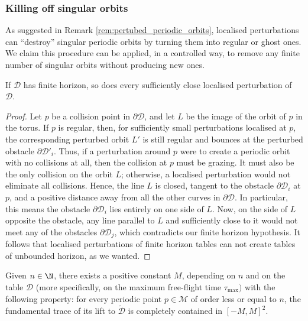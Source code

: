 \documentclass[reqno,11pt]{amsart}
\begin{document}
\subsubsection{Killing off singular orbits} As suggested in Remark \ref{rem:pertubed_periodic_orbits}, localised perturbations can ``destroy'' singular periodic orbits by turning them into regular or ghost ones.
We claim this procedure can be applied, in a controlled way, to remove any finite number of singular orbits without producing new ones.
\begin{lemma}\label{lem:fin_hor_persists}
    If \( \mathcal{D} \) has finite horizon, so does every sufficiently close localised perturbation of \( \mathcal{D}. \)   
\end{lemma}
\begin{proof}
    Let \( p \) be a collision point in \( \partial\mathcal{D} \), and let \( L \) be the image of the orbit of \( p \) in the torus.
    If \( p \) is regular, then, for sufficiently small perturbations localised at \( p \), the corresponding perturbed orbit \( L' \) is still regular and bounces at the perturbed obstacle \( \partial\mathcal{D}'_i \).
    Thus, if a perturbation around \( p \) were to create a periodic orbit with no collisions at all, then the collision at \( p \) must be grazing.
    It must also be the only collision on the orbit \( L \); otherwise, a localised perturbation would not eliminate all collisions.
    Hence, the line \( L \) is closed, tangent to the obstacle \( \partial\mathcal{D}_i \) at \( p \), and a positive distance away from all the other curves in \( \partial\mathcal{D} \).
    In particular, this means the obstacle \( \partial\mathcal{D}_i \) lies entirely on one side of \( L \).
    Now, on the side of \( L \) opposite the obstacle, any line parallel to \( L \) and sufficiently close to it would not meet any of the obstacles \( \partial\mathcal{D}_j \), which contradicts our finite horizon hypothesis.
    It follows that localised perturbations of finite horizon tables can not create tables of unbounded horizon, as we wanted.    
\end{proof}
\par Given \( n \in \N \), there exists a positive constant \( M \), depending on \( n \) and on the table \( \mathcal{D} \) (more specifically, on the maximum free-flight time \( \tau_\mathrm{max}) \) with the following property: for every periodic point \( p \in \mathcal{M} \) of order less or equal to \( n \), the fundamental trace of its lift to \( \widetilde{\mathcal{D}} \) is completely contained in \( [-M, M]^2 \).
\end{document}
